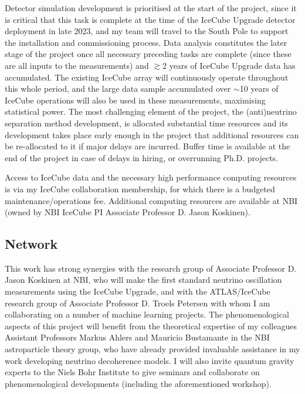 \documentclass[a4paper,11pt]{article}
\begin{document}
Detector simulation development is prioritised at the start of the project, since it is critical that this task is complete at the time of the IceCube Upgrade detector deployment in late 2023, and my team will travel to the South Pole to support the installation and commissioning process. Data analysis constitutes the later stage of the project once all necessary preceding tasks are complete (since these are all inputs to the measurements) and $\gtrsim$2 years of IceCube Upgrade data has accumulated. The existing IceCube array will continuously operate throughout this whole period, and the large data sample accumulated over $\sim$10 years of IceCube operations will also be used in these measurements, maximising statistical power. The most challenging element of the project, the (anti)neutrino separation method development, is allocated substantial time resources and its development takes place early enough in the project that additional resources can be re-allocated to it if major delays are incurred. Buffer time is available at the end of the project in case of delays in hiring, or overrunning Ph.D. projects.

Access to IceCube data and the necessary high performance computing resources is via my IceCube collaboration membership, for which there is a budgeted maintenance/operations fee. Additional computing resources are available at NBI (owned by NBI IceCube PI Associate Professor D. Jason Koskinen). \\




\subsection{Network}

This work has strong synergies with the research group of Associate Professor D. Jason Koskinen at NBI, who will make the first standard neutrino oscillation measurements using the IceCube Upgrade, and with the ATLAS/IceCube research group of Associate Professor D. Troels Petersen with whom I am collaborating on a number of machine learning projects. The phenomenological aspects of this project will benefit from the theoretical expertise of my colleagues Assistant Professors Markus Ahlers and Mauricio Bustamante in the NBI astroparticle theory group, who have already provided invaluable assistance in my work developing neutrino decoherence models. I will also invite quantum gravity experts to the Niels Bohr Institute to give seminars and collaborate on phenomenological developments (including the aforementioned workshop).
\end{document}
